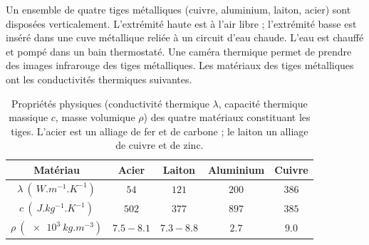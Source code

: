 

Un ensemble de quatre tiges métalliques (cuivre, aluminium, laiton, acier) sont disposées verticalement. L'extrémité haute est à l'air libre ; l'extrémité basse est inséré dans une cuve métallique reliée à un circuit d'eau chaude. L'eau est chauffé et pompé dans un bain thermostaté. Une caméra thermique permet de prendre des images infrarouge des tiges métalliques. Les matériaux des tiges métalliques ont les conductivités thermiques suivantes.

\begin{table}[b]
\centering
\renewcommand{\arraystretch}{1.2}
\begin{tabular}{|c|c|c|c|c|}
\hline
Matériau & Acier & Laiton & Aluminium & Cuivre \\
\hline
$\lambda~(\SI{}{W.m^{-1}.K^{-1}})$ & $54$ & $121$ & $200$ & $386$ \\
\hline
$c~(\SI{}{J.kg^{-1}.K^{-1}})$ & $502$ & $377$ & $897$ & $385$ \\
\hline
$\rho~(\SI{e3}{kg.m^{-3}})$ & $\num{7.5}-\num{8.1}$ & $\num{7.3}-\num{8.8}$ & $\num{2.7}$ & $\num{9.0}$ \\
\hline
\end{tabular}
\caption{Propriétés physiques (conductivité thermique $\lambda$, capacité thermique massique $c$, masse volumique $\rho$) des quatre matériaux constituant les tiges. L’acier est un alliage de fer et de carbone ; le laiton un alliage de cuivre et de zinc.}
\label{tab:donnees}
\end{table}



